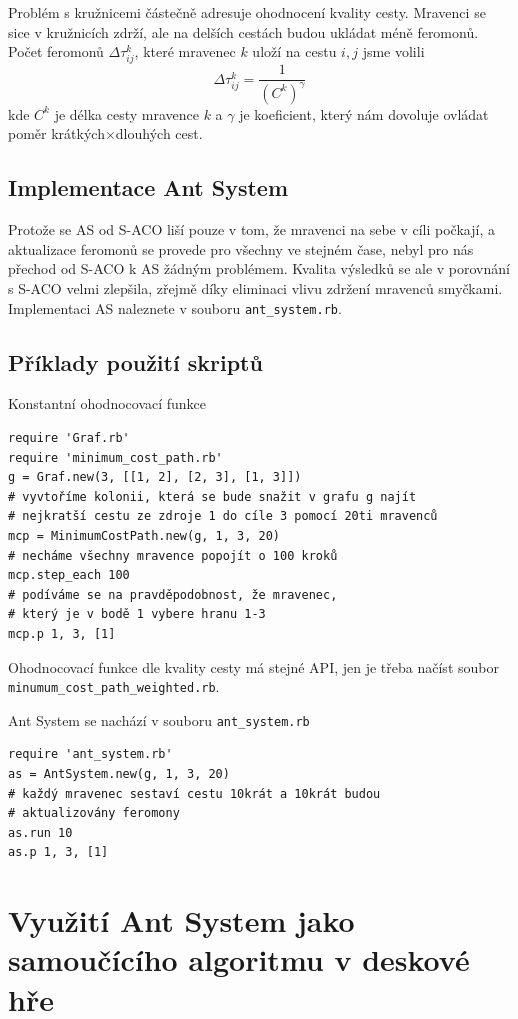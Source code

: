 \documentclass[12pt]{article}
\begin{document}
Problém s kružnicemi částečně adresuje ohodnocení kvality cesty. Mravenci se sice v kružnicích zdrží, ale na delších cestách budou ukládat méně feromonů. Počet feromonů $\Delta \tau_{ij}^k$, které mravenec $k$ uloží na cestu $i, j$ jsme volili
\begin{equation}
\Delta \tau_{ij}^k = \frac{1}{ \left( C^k \right)^\gamma}
\end{equation}
kde $C^k$ je délka cesty mravence $k$ a $\gamma$ je koeficient, který nám dovoluje ovládat poměr krátkých$\times$dlouhých cest. 

\subsection{Implementace Ant System}
Protože se AS od S-ACO liší pouze v tom, že mravenci na sebe v cíli počkají, a aktualizace feromonů se provede pro všechny ve stejném čase, nebyl pro nás přechod od S-ACO k AS žádným problémem. Kvalita výsledků se ale v porovnání s S-ACO velmi zlepšila, zřejmě díky eliminaci vlivu zdržení mravenců smyčkami. Implementaci AS naleznete v souboru \texttt{ant\_system.rb}.

\subsection{Příklady použití skriptů}
Konstantní ohodnocovací funkce
\begin{verbatim}
require 'Graf.rb'
require 'minimum_cost_path.rb'
g = Graf.new(3, [[1, 2], [2, 3], [1, 3]])
# vyvtoříme kolonii, která se bude snažit v grafu g najít 
# nejkratší cestu ze zdroje 1 do cíle 3 pomocí 20ti mravenců
mcp = MinimumCostPath.new(g, 1, 3, 20)
# necháme všechny mravence popojít o 100 kroků
mcp.step_each 100
# podíváme se na pravděpodobnost, že mravenec, 
# který je v bodě 1 vybere hranu 1-3
mcp.p 1, 3, [1]
\end{verbatim}
Ohodnocovací funkce dle kvality cesty má stejné API, jen je třeba načíst soubor \texttt{minumum\_cost\_path\_weighted.rb}.

Ant System se nachází v souboru \texttt{ant\_system.rb}
\begin{verbatim}
require 'ant_system.rb'
as = AntSystem.new(g, 1, 3, 20)
# každý mravenec sestaví cestu 10krát a 10krát budou
# aktualizovány feromony
as.run 10
as.p 1, 3, [1]
\end{verbatim}

\section{Využití Ant System jako samoučícího algoritmu v deskové hře}
\end{document}
